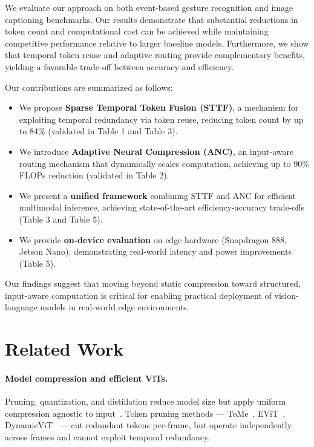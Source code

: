 \documentclass{article}
\begin{document}
We evaluate our approach on both event-based gesture recognition and image captioning benchmarks. Our results demonstrate that substantial reductions in token count and computational cost can be achieved while maintaining competitive performance relative to larger baseline models. Furthermore, we show that temporal token reuse and adaptive routing provide complementary benefits, yielding a favorable trade-off between accuracy and efficiency.

Our contributions are summarized as follows:

\begin{itemize}
\item We propose \textbf{Sparse Temporal Token Fusion (STTF)}, a mechanism for exploiting temporal redundancy via token reuse, reducing token count by up to 84\% (validated in Table 1 and Table 3).

\item We introduce \textbf{Adaptive Neural Compression (ANC)}, an input-aware routing mechanism that dynamically scales computation, achieving up to 90\% FLOPs reduction (validated in Table 2).

\item We present a \textbf{unified framework} combining STTF and ANC for efficient multimodal inference, achieving state-of-the-art efficiency-accuracy trade-offs (Table 3 and Table 5).

\item We provide \textbf{on-device evaluation} on edge hardware (Snapdragon 888, Jetson Nano), demonstrating real-world latency and power improvements (Table 5).
\end{itemize}

Our findings suggest that moving beyond static compression toward structured, input-aware computation is critical for enabling practical deployment of vision-language models in real-world edge environments.


\section{Related Work}

\paragraph{Model compression and efficient ViTs.}
Pruning, quantization, and distillation reduce model size but apply uniform compression agnostic to input~\cite{han2016deepcompression, hinton2015distillation}. Token pruning methods — ToMe~\cite{bolya2023tome}, EViT~\cite{liang2022evit}, DynamicViT~\cite{rao2021dynamicvit} — cut redundant tokens per-frame, but operate independently across frames and cannot exploit temporal redundancy.
\end{document}

